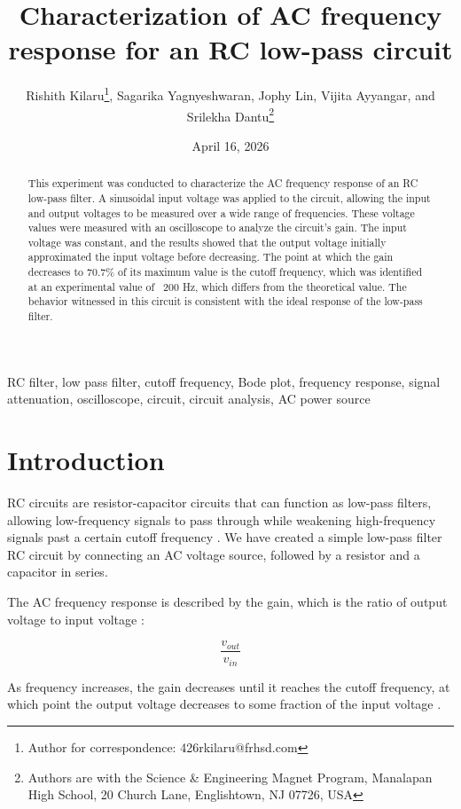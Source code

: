 \documentclass[10pt,journal,twoside]{IEEEtran} %
\title{Characterization of AC frequency response for an RC low-pass circuit} %
\author{Rishith Kilaru\thanks{Author for correspondence: 426rkilaru@frhsd.com}, Sagarika Yagnyeshwaran, Jophy Lin, Vijita Ayyangar, and Srilekha Dantu\thanks{Authors are with the Science \& Engineering Magnet Program, Manalapan High School, 20 Church Lane, Englishtown, NJ 07726, USA}} %
\date{April 16, 2026}
\newcommand{\keywords}{RC filter, low pass filter, cutoff frequency, Bode plot, frequency response, signal attenuation, oscilloscope, circuit, circuit analysis, AC power source} %
\begin{document}
\maketitle

\begin{abstract}

This experiment was conducted to characterize the AC frequency response of an RC low-pass filter. A sinusoidal input voltage was applied to the circuit, allowing the input and output voltages to be measured over a wide range of frequencies. These voltage values were measured with an oscilloscope to analyze the circuit's gain. The input voltage was constant, and the results showed that the output voltage initially approximated the input voltage before decreasing. The point at which the gain decreases to 70.7\% of its maximum value is the cutoff frequency, which was identified at an experimental value of ~200 Hz, which differs from the theoretical value. The behavior witnessed in this circuit is consistent with the ideal response of the low-pass filter.

\end{abstract}

\begin{IEEEkeywords}
\keywords
\end{IEEEkeywords}


\section{Introduction}

RC circuits are resistor-capacitor circuits that can function as low-pass filters, allowing low-frequency signals to pass through while weakening high-frequency signals past a certain cutoff frequency \cite{1}. We have created a simple low-pass filter RC circuit by connecting an AC voltage source, followed by a resistor and a capacitor in series.

The AC frequency response is described by the gain, which is the ratio of output voltage to input voltage \cite{2}: 

\begin{equation}
\frac{v_{out}}{v_{in}}
\end{equation}

As frequency increases, the gain decreases until it reaches the cutoff frequency, at which point the output voltage decreases to some fraction of the input voltage \cite{3}.
\end{document}
